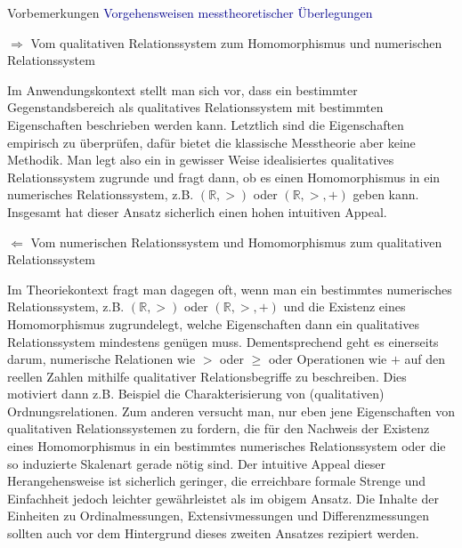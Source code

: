 \documentclass[
  8pt,
  ignorenonframetext,
]{beamer}
\begin{document}
\begin{frame}{Vorbemerkungen}
\protect\hypertarget{vorbemerkungen-1}{}
\textcolor{darkblue}{Vorgehensweisen messtheoretischer Überlegungen}

\small

\(\Rightarrow\) Vom qualitativen Relationssystem zum Homomorphismus und
numerischen Relationssystem

\footnotesize

\justifying Im Anwendungskontext stellt man sich vor, dass ein
bestimmter Gegenstandsbereich als qualitatives Relationssystem mit
bestimmten Eigenschaften beschrieben werden kann. Letztlich sind die
Eigenschaften empirisch zu überprüfen, dafür bietet die klassische
Messtheorie aber keine Methodik. Man legt also ein in gewisser Weise
idealisiertes qualitatives Relationssystem zugrunde und fragt dann, ob
es einen Homomorphismus in ein numerisches Relationssystem, z.B.
\((\mathbb{R},>)\) oder \((\mathbb{R},>,+)\) geben kann. Insgesamt hat
dieser Ansatz sicherlich einen hohen intuitiven Appeal.

\small

\(\Leftarrow\) Vom numerischen Relationssystem und Homomorphismus zum
qualitativen Relationssystem

\footnotesize

Im Theoriekontext fragt man dagegen oft, wenn man ein bestimmtes
numerisches Relationssystem, z.B. \((\mathbb{R},>)\) oder
\((\mathbb{R},>,+)\) und die Existenz eines Homomorphismus zugrundelegt,
welche Eigenschaften dann ein qualitatives Relationssystem mindestens
genügen muss. Dementsprechend geht es einerseits darum, numerische
Relationen wie \(>\) oder \(\ge\) oder Operationen wie \(+\) auf den
reellen Zahlen mithilfe qualitativer Relationsbegriffe zu beschreiben.
Dies motiviert dann z.B. Beispiel die Charakterisierung von
(qualitativen) Ordnungsrelationen. Zum anderen versucht man, nur eben
jene Eigenschaften von qualitativen Relationssystemen zu fordern, die
für den Nachweis der Existenz eines Homomorphismus in ein bestimmtes
numerisches Relationssystem oder die so induzierte Skalenart gerade
nötig sind. Der intuitive Appeal dieser Herangehensweise ist sicherlich
geringer, die erreichbare formale Strenge und Einfachheit jedoch
leichter gewährleistet als im obigem Ansatz. Die Inhalte der Einheiten
zu Ordinalmessungen, Extensivmessungen und Differenzmessungen sollten
auch vor dem Hintergrund dieses zweiten Ansatzes rezipiert werden.
\end{frame}
\end{document}
